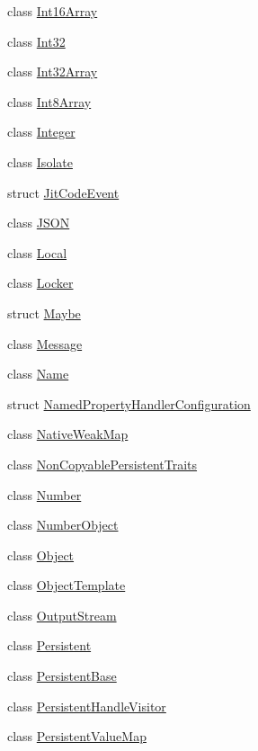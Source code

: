 \begin{DoxyCompactItemize}
\item 
class \hyperlink{classv8_1_1_int16_array}{Int16\+Array}
\item 
class \hyperlink{classv8_1_1_int32}{Int32}
\item 
class \hyperlink{classv8_1_1_int32_array}{Int32\+Array}
\item 
class \hyperlink{classv8_1_1_int8_array}{Int8\+Array}
\item 
class \hyperlink{classv8_1_1_integer}{Integer}
\item 
class \hyperlink{classv8_1_1_isolate}{Isolate}
\item 
struct \hyperlink{structv8_1_1_jit_code_event}{Jit\+Code\+Event}
\item 
class \hyperlink{classv8_1_1_j_s_o_n}{J\+S\+O\+N}
\item 
class \hyperlink{classv8_1_1_local}{Local}
\item 
class \hyperlink{classv8_1_1_locker}{Locker}
\item 
struct \hyperlink{structv8_1_1_maybe}{Maybe}
\item 
class \hyperlink{classv8_1_1_message}{Message}
\item 
class \hyperlink{classv8_1_1_name}{Name}
\item 
struct \hyperlink{structv8_1_1_named_property_handler_configuration}{Named\+Property\+Handler\+Configuration}
\item 
class \hyperlink{classv8_1_1_native_weak_map}{Native\+Weak\+Map}
\item 
class \hyperlink{classv8_1_1_non_copyable_persistent_traits}{Non\+Copyable\+Persistent\+Traits}
\item 
class \hyperlink{classv8_1_1_number}{Number}
\item 
class \hyperlink{classv8_1_1_number_object}{Number\+Object}
\item 
class \hyperlink{classv8_1_1_object}{Object}
\item 
class \hyperlink{classv8_1_1_object_template}{Object\+Template}
\item 
class \hyperlink{classv8_1_1_output_stream}{Output\+Stream}
\item 
class \hyperlink{classv8_1_1_persistent}{Persistent}
\item 
class \hyperlink{classv8_1_1_persistent_base}{Persistent\+Base}
\item 
class \hyperlink{classv8_1_1_persistent_handle_visitor}{Persistent\+Handle\+Visitor}
\item 
class \hyperlink{classv8_1_1_persistent_value_map}{Persistent\+Value\+Map}

\end{DoxyCompactItemize}
